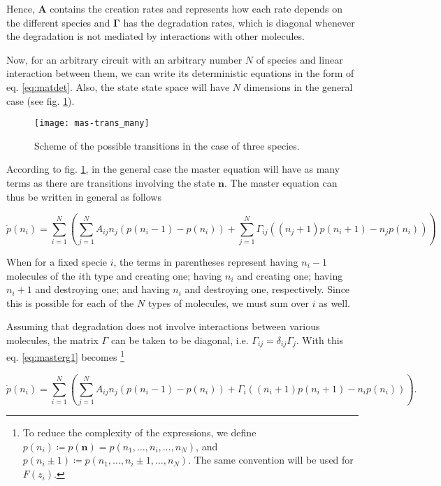 Hence, $\mathbf{A}$ contains the creation rates and represents how each rate depends on the different species and $\mathbf{\Gamma}$ has the degradation rates, which is diagonal whenever the degradation is not mediated by interactions with other molecules.

Now, for an arbitrary circuit with an arbitrary number $N$ of species and linear interaction between them, we can write its deterministic equations in the form of eq. \eqref{eq:matdet}. Also, the state state space will have $N$ dimensions in the general case (see fig. \ref{fig:mas-trans_many}).

\begin{figure}[H]
  \centering
  \texttt{[image: mas-trans\_many]}
  \caption[Transitions between states in general] {\label{fig:mas-trans_many} Scheme of the possible transitions in the case of three species.}
\end{figure}

According to fig. \ref{fig:mas-trans_many}, in the general case the master equation will have as many terms as there are transitions involving the state $\mathbf{n}$. The master equation can thus be written in general as follows

\begin{equation}
\label{eq:masterg1}
\dot{p}(n_i) =  \sum_{i=1}^N\left(\sum_{j=1}^N A_{ij}n_j \left( p(n_i-1) - p(n_i) \right) + \sum_{j=1}^N \Gamma_{ij}((n_j+1)p(n_i+1)-n_jp(n_i))\right)
\end{equation}

When for a fixed specie $i$, the terms in parentheses represent having $n_i-1$ molecules of the $i$th type and creating one; having $n_i$ and creating one; having $n_i+1$ and destroying one; and having $n_i$ and destroying one, respectively. Since this is possible for each of the $N$ types of molecules, we must sum over $i$ as well.

Assuming that degradation does not involve interactions between various molecules, the matrix $\Gamma$ can be taken to be diagonal, i.e. $\Gamma_{ij}=\delta_{ij}\Gamma_j$. With this eq. \eqref{eq:masterg1} becomes \footnote{To reduce the complexity of the expressions, we define $p(n_i) \coloneqq p(\mathbf{n}) = p(n_1,\dotsc,n_i,\dotsc,n_N)$, and $p(n_i\pm1)\coloneqq p(n_1,\dotsc,n_i\pm1,\dotsc,n_N)$. The same convention will be used for $F(z_i)$.}

\begin{equation}
\label{eq:masterg2}
\dot{p}(n_i) =  \sum_{i=1}^N\left(\sum_{j=1}^N A_{ij}n_j \left( p(n_i-1) - p(n_i) \right) + \Gamma_{i}((n_i+1)p(n_i+1)-n_ip(n_i))\right).
\end{equation}

